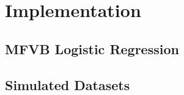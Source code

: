 
\section{Implementation}\label{sec:implement}

\subsection{MFVB Logistic Regression}

\subsection{Simulated Datasets}